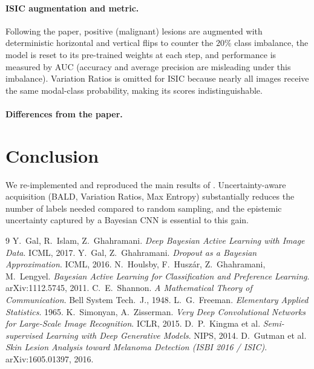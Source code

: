 \documentclass[11pt]{article}
\begin{document}
\paragraph{ISIC augmentation and metric.}
Following the paper, positive (malignant) lesions are augmented with deterministic
horizontal and vertical flips to counter the $20\%$ class imbalance, the model is
reset to its pre-trained weights at each step, and performance is measured by
AUC (accuracy and average precision are misleading under this imbalance).
Variation Ratios is omitted for ISIC because nearly all images receive the same
modal-class probability, making its scores indistinguishable.

\paragraph{Differences from the paper.}

\section{Conclusion}
\label{sec:conclusion}
We re-implemented and reproduced the main results of \cite{gal2017deepbal}.
Uncertainty-aware acquisition (BALD, Variation Ratios, Max Entropy) substantially
reduces the number of labels needed compared to random sampling, and the
epistemic uncertainty captured by a Bayesian CNN is essential to this gain.

\begin{thebibliography}{9}
 Y.~Gal, R.~Islam, Z.~Ghahramani.
  \emph{Deep Bayesian Active Learning with Image Data}. ICML, 2017.
 Y.~Gal, Z.~Ghahramani.
  \emph{Dropout as a Bayesian Approximation}. ICML, 2016.
 N.~Houlsby, F.~Husz\'ar, Z.~Ghahramani, M.~Lengyel.
  \emph{Bayesian Active Learning for Classification and Preference Learning}.
  arXiv:1112.5745, 2011.
 C.~E.~Shannon.
  \emph{A Mathematical Theory of Communication}. Bell System Tech.\ J., 1948.
 L.~G.~Freeman. \emph{Elementary Applied Statistics}. 1965.
 K.~Simonyan, A.~Zisserman.
  \emph{Very Deep Convolutional Networks for Large-Scale Image Recognition}.
  ICLR, 2015.
 D.~P.~Kingma et al.
  \emph{Semi-supervised Learning with Deep Generative Models}. NIPS, 2014.
 D.~Gutman et al.
  \emph{Skin Lesion Analysis toward Melanoma Detection (ISBI 2016 / ISIC)}.
  arXiv:1605.01397, 2016.
\end{thebibliography}
\end{document}
